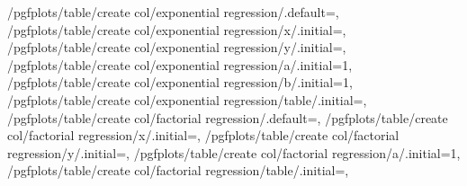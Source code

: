 {%
        /pgfplots/table/create col/exponential regression/.default=,%
        /pgfplots/table/create col/exponential regression/x/.initial=,%
        /pgfplots/table/create col/exponential regression/y/.initial=,%
        /pgfplots/table/create col/exponential regression/a/.initial=1,%
        /pgfplots/table/create col/exponential regression/b/.initial=1,%
        /pgfplots/table/create col/exponential regression/table/.initial=,%
%
        /pgfplots/table/create col/factorial regression/.default=,%
        /pgfplots/table/create col/factorial regression/x/.initial=,%
        /pgfplots/table/create col/factorial regression/y/.initial=,%
        /pgfplots/table/create col/factorial regression/a/.initial=1,%
        /pgfplots/table/create col/factorial regression/table/.initial=,%
}
\makeatother
